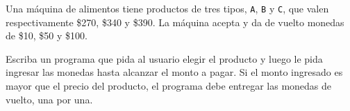 Una máquina de alimentos tiene productos de tres tipos,
\texttt{A}, \texttt{B} y \texttt{C},
que valen respectivamente \$270, \$340 y \$390.
La máquina acepta y da de vuelto monedas de \$10, \$50 y \$100.

Escriba un programa que pida al usuario elegir el producto
y luego le pida ingresar las monedas hasta alcanzar el monto a pagar.
Si el monto ingresado es mayor que el precio del producto,
el programa debe entregar las monedas de vuelto, una por una.

\begin{minipage}[t]{.28\textwidth}
  
\end{minipage}
\hfill
\begin{minipage}[t]{.28\textwidth}
  
\end{minipage}
\hfill
\begin{minipage}[t]{.28\textwidth}
  
\end{minipage}

